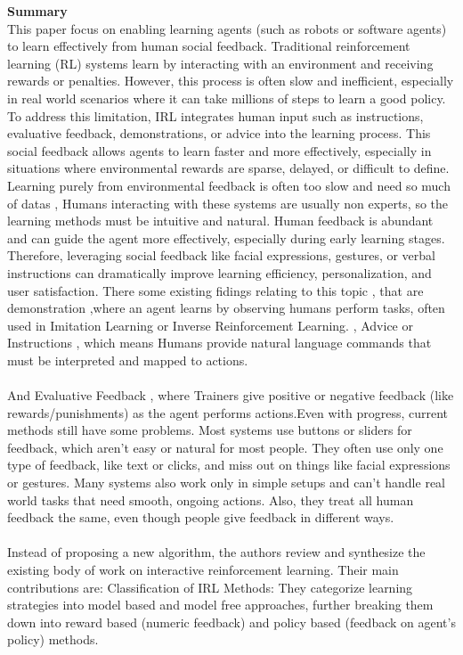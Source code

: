 \documentclass[report.tex]{subfiles}
\begin{document}
\noindent\textbf{Summary} \\
This paper focus on enabling learning agents (such as robots or software agents) to learn effectively from human social feedback. Traditional reinforcement learning (RL) systems learn by interacting with an environment and receiving rewards or penalties. However, this process is often slow and inefficient, especially in real world scenarios where it can take millions of steps to learn a good policy. To address this limitation, IRL integrates human input such as instructions, evaluative feedback, demonstrations, or advice into the learning process. This social feedback allows agents to learn faster and more effectively, especially in situations where environmental rewards are sparse, delayed, or difficult to define.
\noindent\textbf{}\\Learning purely from environmental feedback is often too slow and need so much of datas , Humans interacting with these systems are usually non experts, so the learning methods must be intuitive and natural. Human feedback is abundant and can guide the agent more effectively, especially during early learning stages. Therefore, leveraging social feedback like facial expressions, gestures, or verbal instructions can dramatically improve learning efficiency, personalization, and user satisfaction. There some existing fidings relating to this topic , that are 
demonstration ,where an agent learns by observing humans perform tasks, often used in Imitation Learning or Inverse Reinforcement Learning. , Advice or Instructions  , which means Humans provide natural language commands that must be interpreted and mapped to actions.\\\\
And Evaluative Feedback , where Trainers give positive or negative feedback (like rewards/punishments) as the agent performs actions.Even with progress, current methods still have some problems. Most systems use buttons or sliders for feedback, which aren’t easy or natural for most people. They often use only one type of feedback, like text or clicks, and miss out on things like facial expressions or gestures. Many systems also work only in simple setups and can’t handle real world tasks that need smooth, ongoing actions. Also, they treat all human feedback the same, even though people give feedback in different ways.\\
\noindent\textbf{}\\ Instead of proposing a new algorithm, the authors review and synthesize the existing body of work on interactive reinforcement learning. Their main contributions are:
Classification of IRL Methods: They categorize learning strategies into model based and model free approaches, further breaking them down into reward based (numeric feedback) and policy based (feedback on agent’s policy) methods.
\end{document}
